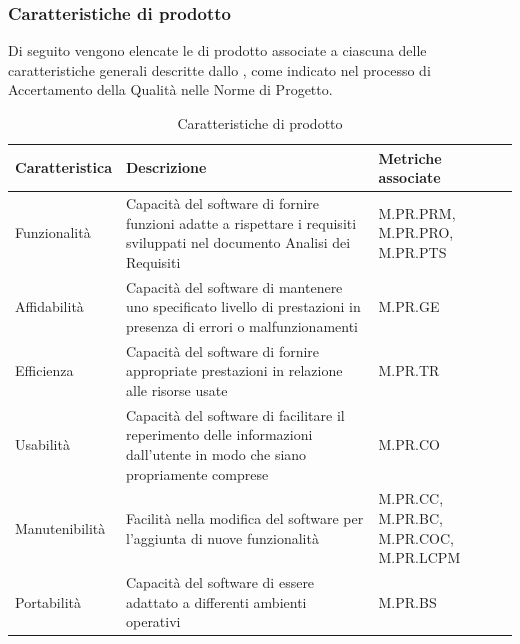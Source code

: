 \subsubsection{Caratteristiche di prodotto}
Di seguito vengono elencate le  di prodotto associate a ciascuna delle caratteristiche generali descritte dallo , 
come indicato nel processo di Accertamento della Qualità nelle Norme di Progetto.
\begin{table}[H]
    \centering
    \begin{tabularx}{\textwidth}{| X | X | X |}
    \hline
        \textbf{Caratteristica} & 
        \textbf{Descrizione} &
        \textbf{Metriche associate}\\
    \hline
        Funzionalità & Capacità del software di fornire funzioni adatte a rispettare i requisiti sviluppati nel documento Analisi dei Requisiti & M.PR.PRM, M.PR.PRO, M.PR.PTS \\
    \hline
        Affidabilità & Capacità del software di mantenere uno specificato livello di prestazioni in presenza di errori o malfunzionamenti & M.PR.GE\\
    \hline
        Efficienza & Capacità del software di fornire appropriate prestazioni in relazione alle risorse usate & M.PR.TR\\
    \hline
        Usabilità & Capacità del software di facilitare il reperimento delle informazioni dall'utente in modo che siano propriamente comprese & M.PR.CO \\
    \hline
        Manutenibilità & Facilità nella modifica del software per l'aggiunta di nuove funzionalità & M.PR.CC, M.PR.BC, M.PR.COC, M.PR.LCPM\\
    \hline
        Portabilità & Capacità del software di essere adattato a differenti ambienti operativi & M.PR.BS\\
    \hline
    \end{tabularx}
    \caption{Caratteristiche di prodotto}
    \label{tab:caratteristiche_prodotto} 
\end{table}





